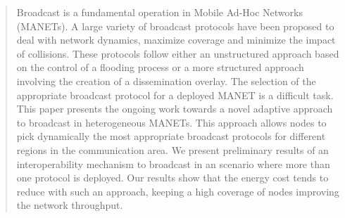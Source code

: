 \begin{abstract}
Broadcast is a fundamental operation in Mobile Ad-Hoc Networks (MANETs).
%
A large variety of broadcast protocols have been proposed to deal with network dynamics, maximize coverage and minimize the impact of collisions.
%
These protocols follow either an unstructured approach based on the control of a flooding process or a more structured approach involving the creation of a dissemination overlay.
%
The selection of the appropriate broadcast protocol for a deployed MANET is a difficult task.
%
This paper presents the ongoing work towards a novel adaptive approach to broadcast in heterogeneous MANETs.
%
This approach allows nodes to pick dynamically the most appropriate broadcast protocols for different regions in the communication area.
%
We present preliminary results of an interoperability mechanism to broadcast in an scenario where more than one protocol is deployed.
%
Our results show that the energy cost tends to reduce with such an approach, keeping a high coverage of nodes improving the network throughput.
\end{abstract}